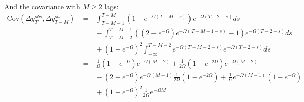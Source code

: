 And the covariance with $M \geq 2$ lags: 
\begin{align*}
\mathrm{Cov}(\Delta y_T^{obs},\Delta y_{T-M}^{obs}) 
&=-\int_{T-M-1}^{T-M}  ( 1 - e^{-\Omega (T-M-s)} ) e^{-\Omega (T-2-s)} ds \\ 
& \qquad - \int_{T-M-2}^{T-M-1}\left( (2-e^{-\Omega}) e^{-\Omega (T-M-1-s)} -1  \right)e^{-\Omega (T-2-s)} ds \\
& \qquad +  (1-e^{-\Omega})^2 \int_{-\infty}^{T-M-2}  e^{-\Omega (T-M-2-s)} e^{-\Omega (T-2-s)} ds \\
&= -\frac{1}{\Omega}(1-e^{-\Omega})e^{-\Omega (M-2)} +\frac{1}{2\Omega}(1-e^{-2\Omega})e^{-\Omega (M-2)} \\
& \qquad - (2-e^{-\Omega}) e^{-\Omega(M-1)}\frac{1}{2\Omega}(1-e^{-2\Omega}) + \frac{1}{\Omega} e^{-\Omega(M-1)} (1-e^{-\Omega})\\
& \qquad +(1-e^{-\Omega})^2 \frac{1}{2\Omega} e^{-\Omega M} \\
\end{align*}


